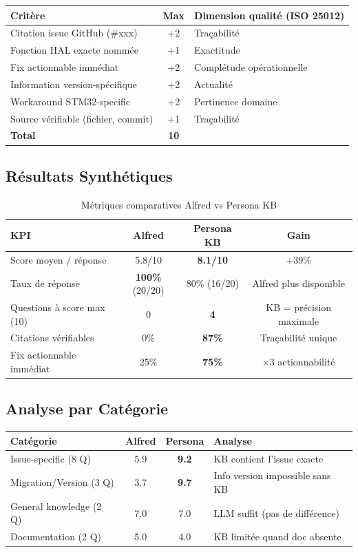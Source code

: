 \begin{longtable}{p{4.5cm}cp{6cm}}
\toprule
\textbf{Critère} & \textbf{Max} & \textbf{Dimension qualité (ISO 25012)} \\
\midrule
Citation issue GitHub (\#xxx) & +2 & Traçabilité \\
Fonction HAL exacte nommée & +1 & Exactitude \\
Fix actionnable immédiat & +2 & Complétude opérationnelle \\
Information version-spécifique & +2 & Actualité \\
Workaround STM32-specific & +2 & Pertinence domaine \\
Source vérifiable (fichier, commit) & +1 & Traçabilité \\
\midrule
\textbf{Total} & \textbf{10} & \\
\bottomrule
\end{longtable}

\subsection{Résultats Synthétiques}

\begin{table}[H]
\centering
\begin{tabular}{lccc}
\toprule
\textbf{KPI} & \textbf{Alfred} & \textbf{Persona KB} & \textbf{Gain} \\
\midrule
Score moyen / réponse & 5.8/10 & \textbf{8.1/10} & +39\% \\
Taux de réponse & \textbf{100\%} (20/20) & 80\% (16/20) & Alfred plus disponible \\
Questions à score max (10) & 0 & \textbf{4} & KB = précision maximale \\
Citations vérifiables & 0\% & \textbf{87\%} & Traçabilité unique \\
Fix actionnable immédiat & 25\% & \textbf{75\%} & $\times 3$ actionnabilité \\
\bottomrule
\end{tabular}
\caption{Métriques comparatives Alfred vs Persona KB}
\label{tab:comparative_final}
\end{table}

\subsection{Analyse par Catégorie}

\begin{longtable}{p{4cm}ccp{5cm}}
\toprule
\textbf{Catégorie} & \textbf{Alfred} & \textbf{Persona} & \textbf{Analyse} \\
\midrule
Issue-specific (8 Q) & 5.9 & \textbf{9.2} & KB contient l'issue exacte \\
Migration/Version (3 Q) & 3.7 & \textbf{9.7} & Info version impossible sans KB \\
General knowledge (2 Q) & 7.0 & 7.0 & LLM suffit (pas de différence) \\
Documentation (2 Q) & 5.0 & 4.0 & KB limitée quand doc absente \\
\bottomrule
\end{longtable}

